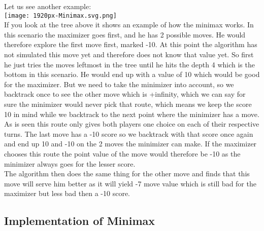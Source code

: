 Let us see another example:\\
\texttt{[image: 1920px-Minimax.svg.png]}\\
If you look at the tree above it shows an example of how the minimax works. In this scenario the maximizer goes first, and he has 2 possible moves. 
He would therefore explore the first move first, marked -10. At this point the algorithm has not simulated this move yet and therefore does not know that value yet. 
So first he just tries the moves leftmost in the tree until he hits the depth 4 which is the bottom in this scenario. He would end up with a value of 10 which would be good for the maximizer. 
But we need to take the minimizer into account, so we backtrack once to see the other move which is +infinity, 
which we can say for sure the minimizer would never pick that route, which means we keep the score 10 in mind while we backtrack to the next point where the minimizer has a move. 
As is seen this route only gives both players one choice on each of their respective turns. 
The last move has a -10 score so we backtrack with that score once again and end up 10 and -10 on the 2 moves the minimizer can make. 
If the maximizer chooses this route the point value of the move would therefore be -10 as the minimizer always goes for the lesser score.\\
The algorithm then does the same thing for the other move and finds that this move will serve him better as it will yield -7 move value which is still bad for the maximizer but less bad then a -10 score.

\subsection{Implementation of Minimax}
\label{subsec:Implementation of Minimax}

\clearpage